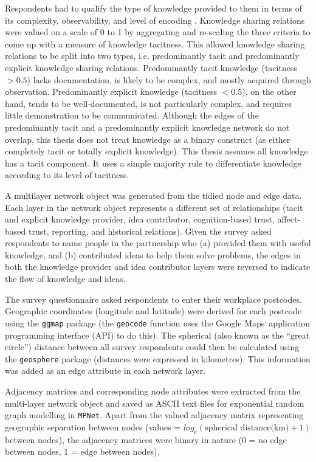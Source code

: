 Respondents had to qualify the type of knowledge provided to them in terms of its complexity, observability, and level of encoding \citep{winter1987knowledge,zander1995knowledge,cavusgil2003tacit}. Knowledge sharing relations were valued on a scale of 0 to 1 by aggregating and re-scaling the three criteria to come up with a measure of knowledge tacitness. This allowed knowledge sharing relations to be split into two types, i.e. predominantly tacit and predominantly explicit knowledge sharing relations. Predominantly tacit knowledge (tacitness $> 0.5$) lacks documentation, is likely to be complex, and mostly acquired through observation. Predominantly explicit knowledge (tacitness $< 0.5$), on the other hand, tends to be well-documented, is not particularly complex, and requires little demonstration to be communicated. Although the edges of the predominantly tacit and a predominantly explicit knowledge network do not overlap, this thesis does not treat knowledge as a binary construct (as either completely tacit or totally explicit knowledge). This thesis assumes all knowledge has a tacit component. It uses a simple majority rule to differentiate knowledge according to its level of tacitness. \medskip

A multilayer network object was generated from the tidied node and edge data. Each layer in the network object represents a different set of relationships (tacit and explicit knowledge provider, idea contributor, cognition-based trust, affect-based trust, reporting, and historical relations). Given the survey asked respondents to name people in the partnership who (a) provided them with useful knowledge, and (b) contributed ideas to help them solve problems, the edges in both the knowledge provider and idea contributor layers were reversed to indicate the flow of knowledge and ideas. \medskip

The survey questionnaire asked respondents to enter their workplace postcodes. Geographic coordinates (longitude and latitude) were derived for each postcode using the \texttt{ggmap} package (the \texttt{geocode} function uses the Google Maps\texttrademark\ application programming interface (API) to do this). The spherical (also known as the \enquote{great circle}) distance between all survey respondents could then be calculated using the \texttt{geosphere} package (distances were expressed in kilometres). This information was added as an edge attribute in each network layer. \medskip

Adjacency matrices and corresponding node attributes were extracted from the multi-layer network object and saved as ASCII text files for exponential random graph modelling in \texttt{MPNet}. Apart from the valued adjacency matrix representing geographic separation between nodes (values = $log_e(\text{spherical distance(km)} + 1)$ between nodes), the adjacency matrices were binary in nature (0 = no edge between nodes, 1 = edge between nodes). 


